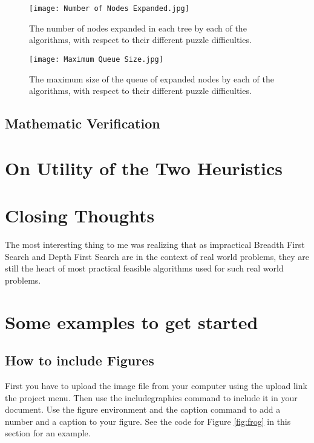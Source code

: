 \documentclass[a4paper]{article}
\begin{document}
\begin{figure}
\centering
\texttt{[image: Number of Nodes Expanded.jpg]}
\caption{\label{fig:Number of Nodes Expanded}The number of nodes expanded in
  each tree by each of the algorithms, with respect to their different puzzle difficulties.}
\end{figure}

\begin{figure}
\centering
\texttt{[image: Maximum Queue Size.jpg]}
\caption{\label{fig:Maximum Queue Size}The maximum size of the queue of expanded nodes by each of the algorithms, with respect to their different puzzle difficulties.}
\end{figure}

\subsection{Mathematic Verification} %

\section{On Utility of the Two Heuristics}

\section{Closing Thoughts}
The most interesting thing to me was realizing that as impractical Breadth First Search and
Depth First Search are in the context of real world problems, they are still the
heart of most practical feasible algorithms used for such real world problems.

\section{Some examples to get started}

\subsection{How to include Figures}

First you have to upload the image file from your computer using the upload link the project menu. Then use the includegraphics command to include it in your document. Use the figure environment and the caption command to add a number and a caption to your figure. See the code for Figure \ref{fig:frog} in this section for an example.
\end{document}
